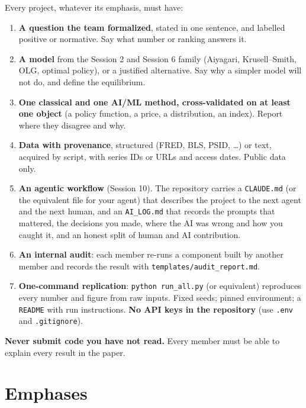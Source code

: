 \documentclass[11pt]{article}
\begin{document}
Every project, whatever its emphasis, must have:
\begin{enumerate}[leftmargin=*,itemsep=2pt]
  \item \textbf{A question the team formalized}, stated in one sentence, and labelled positive or
        normative. Say what number or ranking answers it.
  \item \textbf{A model} from the Session 2 and Session 6 family (Aiyagari, Krusell--Smith, OLG,
        optimal policy), or a justified alternative. Say why a simpler model will not do, and define
        the equilibrium.
  \item \textbf{One classical and one AI/ML method, cross-validated on at least one object} (a policy
        function, a price, a distribution, an index). Report where they disagree and why.
  \item \textbf{Data with provenance}, structured (FRED, BLS, PSID, \dots) or text, acquired by
        script, with series IDs or URLs and access dates. Public data only.
  \item \textbf{An agentic workflow} (Session 10). The repository carries a \texttt{CLAUDE.md} (or the
        equivalent file for your agent) that describes the project to the next agent and the next
        human, and an \texttt{AI\_LOG.md} that records the prompts that mattered, the decisions you
        made, where the AI was wrong and how you caught it, and an honest split of human and AI
        contribution.
  \item \textbf{An internal audit}: each member re-runs a component built by another member and
        records the result with \texttt{templates/audit\_report.md}.
  \item \textbf{One-command replication}: \texttt{python run\_all.py} (or equivalent) reproduces every
        number and figure from raw inputs. Fixed seeds; pinned environment; a \texttt{README} with
        run instructions. \textbf{No API keys in the repository} (use \texttt{.env} and
        \texttt{.gitignore}).
\end{enumerate}

\textbf{Never submit code you have not read.} Every member must be able to explain every result in
the paper.

\section{Emphases}
\end{document}
